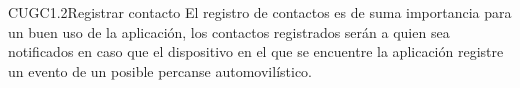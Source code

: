 
\begin{UseCase}{CUGC1.2}{Registrar contacto}
    {
	El registro de contactos es de suma importancia para un buen uso de la aplicación, los contactos registrados serán a quien sea notificados en caso que el dispositivo en el que se encuentre la aplicación registre un evento de un posible percanse automovilístico.
    }

\end{UseCase}
